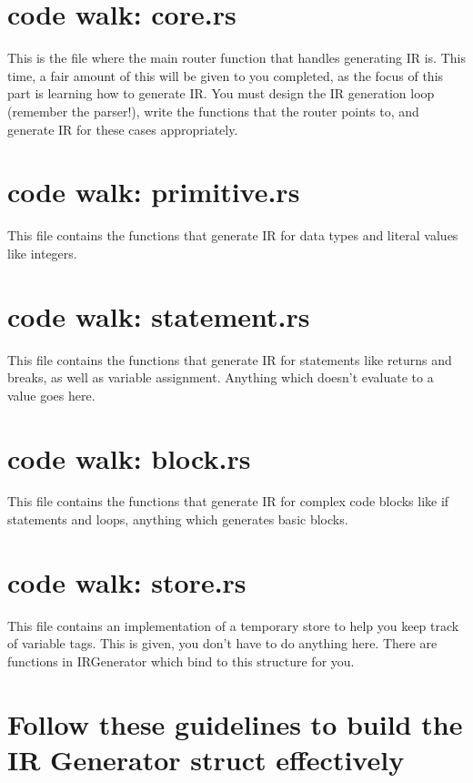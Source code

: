 \documentclass[
	12pt, %
]{fphw}
\begin{document}
\section*{code walk: core.rs}
This is the file where the main router function that handles generating IR is. This time, a fair amount of this will be given to you completed, as the focus of this part is learning how to generate IR. You must design the IR generation loop (remember the parser!), write the functions that the router points to, and generate IR for these cases appropriately. 

\section*{code walk: primitive.rs}
This file contains the functions that generate IR for data types and literal values like integers.

\section*{code walk: statement.rs}
This file contains the functions that generate IR for statements like returns and breaks, as well as variable assignment. Anything which doesn't evaluate to a value goes here.

\section*{code walk: block.rs}
This file contains the functions that generate IR for complex code blocks like if statements and loops, anything which generates basic blocks.

\section*{code walk: store.rs}
This file contains an implementation of a temporary store to help you keep track of variable tags. This is given, you don't have to do anything here. There are functions in IRGenerator which bind to this structure for you.


\pagebreak

\section*{Follow these guidelines to build the IR Generator struct effectively}
\end{document}
